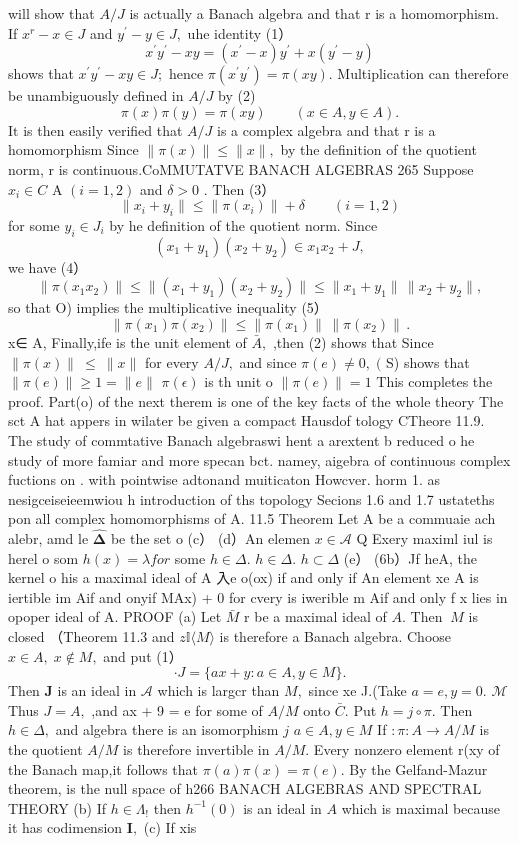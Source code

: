 will show that $A/J$ is actually a Banach algebra and that r is a homomorphism. If $x^{r}-x\in J$ and $y^{\prime}-y\in J,$ uhe identity (1） $$ x^{\prime}y^{\prime}-x y=(x^{\prime}-x)y^{\prime}+x(y^{\prime}-y) $$ shows that $x^{\prime}y^{\prime}-x y\in J;$ hence $\pi(x^{\prime}y^{\prime})=\pi(x y).$ Multiplication can therefore be unambiguously defined in $A/J$ by (2) $$ \pi(x)\pi(y)=\pi(x y)\qquad(x\in A,y\in A). $$ $\mathrm{{It}}$ is then easily verified that $A/J$ is a complex algebra and that r is a homomorphism Since $\|\pi(x)\|\leq\|x\|,$ by the definition of the quotient norm, r is continuous.CoMMUTATVE BANACH ALGEBRAS 265 Suppose $x_{i}\in C$ A $(i=1,2)$ and $\delta>0$ . Then (3） $$ \|x_{i}+y_{i}\|\leq\|\pi(x_{i})\|+\delta\qquad(i=1,2) $$ for some $y_{i}\in J_{i}$ by he definition of the quotient norm. Since $$ (x_{1}+y_{1})(x_{2}+y_{2})\in x_{1}x_{2}+J, $$ we have (4） $$ \|\pi(x_{1}x_{2})\|\leq\|(x_{1}+y_{1})(x_{2}+y_{2})\|\leq\|x_{1}+y_{1}\|\,\|x_{2}+y_{2}\|, $$ so that O) implies the multiplicative inequality (5） $$ \|\pi(x_{1})\pi(x_{2})\|\le\|\pi(x_{1})\|\,\|\pi(x_{2})\|\,. $$ x∈ A, Finally,ife is the unit element of ${\bar{A}},$ ,then (2) shows that Since $\|\pi(x)\|\ \leq\ \|x\|$ for every $A/J,$ and since $\pi(e)\neq0,\;($ S) shows that $\|\pi(e)\|\geq1=\|e\|$ $\scriptstyle\pi(\epsilon)$ is th unit o $\|\pi(e)\|=1$ This completes the proof. Part(o) of the next therem is one of the key facts of the whole theory The sct A hat appers in wilater be given a compact Hausdof tology CTheore 11.9. The study of commtative Banach algebraswi hent a arextent b reduced o he study of more famiar and more specan bct. namey, aigebra of continuous complex fuctions on . with pointwise adtonand muiticaton Howcver. horm 1. as nesigceiseieemwiou h introduction of ths topology Secions 1.6 and 1.7 ustateths pon all complex homomorphisms of A. 11.5 Theorem Let A be a commuaie ach alebr, amd le $\hat{\boldsymbol{\Delta}}$ be the set o (c） (d）An elemen $\scriptstyle x\in{\mathcal{A}}$ Q Exery maximl iul is herel o som $h(x)=\lambda f o r$ some $h\in\Delta.$ $h\in\Delta.$ ${\mathit{h}}\subset\Delta$ (e） (6b）Jf heA, the kernel o his a maximal ideal of A 入e o(ox) if and only if An element xe A is iertible im Aif and onyif MAx) + 0 for cvery is iwerible m Aif and only f x lies in opoper ideal of A. PROOF (a) Let $\bar{M}$ r be a maximal ideal of $A.$ Then $\ M$ is closed （Theorem 11.3 and $z\mathbb{I} \langle M \rangle$ is therefore a Banach algebra. Choose $x\in A,\;x\notin M,$ and put (1） $$ \cdot J=\{a x+y\colon a\in A,y\in M\}. $$ Then $\boldsymbol{J}$ is an ideal in $\scriptstyle{\mathcal{A}}$ which is largcr than $M,$ since xe J.(Take $a=e,y=0.$ $\mathcal{M}$ Thus $J=A,$ ,and ax + 9 = e for some of $A/M$ onto ${\bar{C}}.$ Put $h=j\circ\pi.$ Then $h\in\Delta,$ and algebra there is an isomorphism $j$ $a\in A,y\in M$ If ${\mathfrak{:}}\pi\colon A\to A/M$ is the quotient $A/M$ is therefore invertible in $A/M.$ Every nonzero element r(xy of the Banach map,it follows that $\pi(a)\pi(x)=\pi(e).$ By the Gelfand-Mazur theorem, is the null space of h266 BANACH ALGEBRAS AND SPECTRAL THEORY (b) If $h\in\Lambda_{!}$ then $h^{-1}(0)$ is an ideal in $\scriptstyle{A}$ which is maximal because it has codimension ${\textbf{I}},$ (c) If xis 